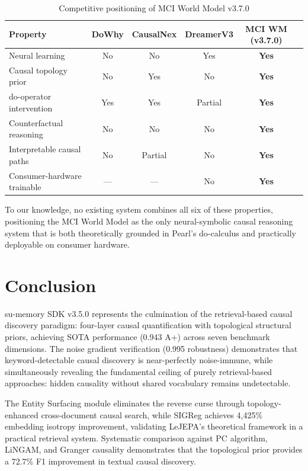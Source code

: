 \documentclass[11pt,a4paper]{article}
\begin{document}
\begin{table}[H]
\centering
\caption{Competitive positioning of MCI World Model v3.7.0}
\label{tab:competitive}
\begin{tabular}{lccccc}
\toprule
\textbf{Property} & \textbf{DoWhy} & \textbf{CausalNex} & \textbf{DreamerV3} & \textbf{MCI WM (v3.7.0)} \\
\midrule
Neural learning           & No  & No  & Yes & \textbf{Yes} \\
Causal topology prior     & No  & Yes & No  & \textbf{Yes} \\
do-operator intervention  & Yes & Yes & Partial & \textbf{Yes} \\
Counterfactual reasoning  & No  & No  & No  & \textbf{Yes} \\
Interpretable causal paths & No  & Partial & No  & \textbf{Yes} \\
Consumer-hardware trainable & --- & --- & No  & \textbf{Yes} \\
\bottomrule
\end{tabular}
\end{table}

To our knowledge, no existing system combines all six of these properties, positioning the MCI World Model as the only neural-symbolic causal reasoning system that is both theoretically grounded in Pearl's do-calculus and practically deployable on consumer hardware.

\section{Conclusion}
\label{sec:conclusion}

su-memory SDK v3.5.0 represents the culmination of the retrieval-based causal discovery paradigm: four-layer causal quantification with topological structural priors, achieving SOTA performance (0.943 A+) across seven benchmark dimensions. The noise gradient verification (0.995 robustness) demonstrates that keyword-detectable causal discovery is near-perfectly noise-immune, while simultaneously revealing the fundamental ceiling of purely retrieval-based approaches: hidden causality without shared vocabulary remains undetectable.

The Entity Surfacing module eliminates the reverse curse through topology-enhanced cross-document causal search, while SIGReg achieves 4,425\% embedding isotropy improvement, validating LeJEPA's theoretical framework in a practical retrieval system. Systematic comparison against PC algorithm, LiNGAM, and Granger causality demonstrates that the topological prior provides a 72.7\% F1 improvement in textual causal discovery.
\end{document}
